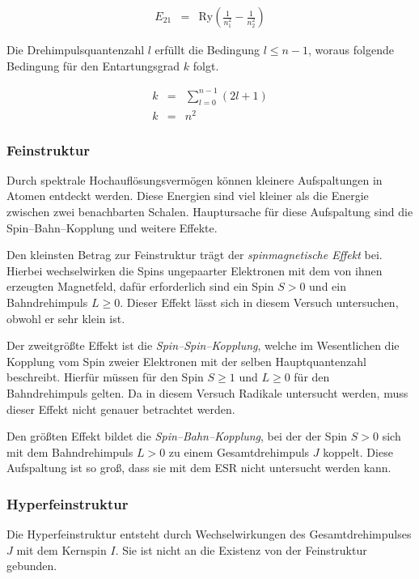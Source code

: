 \documentclass[12pt,a4paper]{scrartcl}
\numberwithin{equation}{section} %
\begin{document}
\begin{eqnarray}
	E_{21} &=& \mathrm{Ry} \left( \frac{1}{n_1^2} - \frac{1}{n_2^2} \right)
\end{eqnarray}

\noindent
Die Drehimpulsquantenzahl $l$ erfüllt die Bedingung $l \leq n - 1$, woraus folgende Bedingung für den Entartungsgrad $k$ folgt.

\begin{eqnarray}
	k &=& \sum_{l=0}^{n-1} (2l+1) \\
	k &=& n^2
\end{eqnarray}

\subsubsection{Feinstruktur}

Durch spektrale Hochauflösungsvermögen können kleinere Aufspaltungen in Atomen entdeckt werden. Diese Energien sind viel kleiner als die Energie zwischen zwei benachbarten Schalen. Hauptursache für diese Aufspaltung sind die Spin--Bahn--Kopplung und weitere Effekte. \cite{Weber}

Den kleinsten Betrag zur Feinstruktur trägt der \emph{spinmagnetische Effekt} bei. Hierbei wechselwirken die Spins ungepaarter Elektronen mit dem von ihnen erzeugten Magnetfeld, dafür erforderlich sind ein Spin $S>0$ und ein Bahndrehimpuls $L\geq 0$. Dieser Effekt lässt sich in diesem Versuch untersuchen, obwohl er sehr klein ist.

Der zweitgrößte Effekt ist die \emph{Spin--Spin--Kopplung}, welche im Wesentlichen die Kopplung vom Spin zweier Elektronen mit der selben Hauptquantenzahl beschreibt. Hierfür müssen für den Spin $S\geq 1$ und $L\geq 0$ für den Bahndrehimpuls gelten. Da in diesem Versuch Radikale untersucht werden, muss dieser Effekt nicht genauer betrachtet werden.

Den größten Effekt bildet die \emph{Spin--Bahn--Kopplung}, bei der der Spin $S>0$ sich mit dem Bahndrehimpuls $L>0$ zu einem Gesamtdrehimpuls $J$ koppelt. Diese Aufspaltung ist so groß, dass sie mit dem ESR nicht untersucht werden kann.

\subsubsection{Hyperfeinstruktur}
Die Hyperfeinstruktur entsteht durch Wechselwirkungen des Gesamtdrehimpulses $J$ mit dem Kernspin $I$. Sie ist nicht an die Existenz von der Feinstruktur gebunden.
\end{document}
